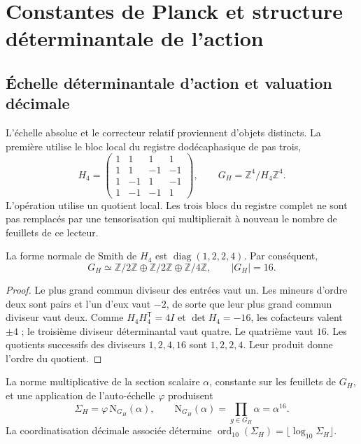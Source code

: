 \section{Constantes de Planck et structure déterminantale de l'action}
\label{sec:action}
\subsection{Échelle déterminantale d'action et valuation décimale}

L'échelle absolue et le correcteur relatif proviennent d'objets
distincts. La première utilise le bloc local du registre dodécaphasique
de pas trois,
\begin{equation}
 H_4=\begin{pmatrix}
 1&1&1&1\\1&1&-1&-1\\1&-1&1&-1\\1&-1&-1&1
 \end{pmatrix},\qquad
 G_H=\mathbb Z^4/H_4\mathbb Z^4.
 \label{eq:el-h4}
\end{equation}
L'opération utilise un quotient local. Les trois blocs du registre
complet ne sont pas remplacés par une tensorisation qui multiplierait à
nouveau le nombre de feuillets de ce lecteur.

\begin{lemma}
La forme normale de Smith de \(H_4\) est
\(\operatorname{diag}(1,2,2,4)\). Par conséquent,
\[
 G_H\simeq\mathbb Z/2\mathbb Z\oplus\mathbb Z/2\mathbb Z
 \oplus\mathbb Z/4\mathbb Z,\qquad |G_H|=16.
\]
\end{lemma}
\begin{proof}
Le plus grand commun diviseur des entrées vaut un. Les mineurs d'ordre deux
sont pairs et l'un d'eux vaut \(-2\), de sorte que leur plus grand commun diviseur
vaut deux. Comme \(H_4H_4^{\mathsf T}=4I\) et \(\det H_4=-16\), les
cofacteurs valent \(\pm4\) ; le troisième diviseur déterminantal vaut quatre.
Le quatrième vaut \(16\). Les quotients successifs des diviseurs
\(1,2,4,16\) sont \(1,2,2,4\). Leur produit donne l'ordre du quotient.
\end{proof}

\begin{definition}
La norme multiplicative de la section scalaire \(\alpha\), constante
sur les feuillets de \(G_H\), et une application de l'auto-échelle
\(\varphi\) produisent
\begin{equation}
 \Sigma_H=\varphi\,\mathrm N_{G_H}(\alpha),\qquad
 \mathrm N_{G_H}(\alpha)=\prod_{g\in G_H}\alpha=\alpha^{16}.
 \label{eq:el-lector-determinantal}
\end{equation}
La coordinatisation décimale associée détermine
\(\operatorname{ord}_{10}(\Sigma_H)=\lfloor\log_{10}\Sigma_H\rfloor\).
\end{definition}

